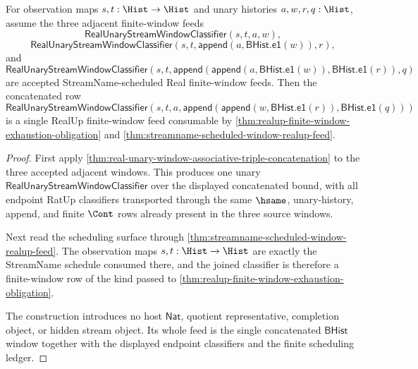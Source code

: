 \begin{theorem}
\label{thm:realup-window-concatenation-streamname-feed}
For observation maps $s,t:\Hist\to\Hist$ and unary histories
$a,w,r,q:\Hist$, assume the three adjacent finite-window feeds
$$
\mathsf{RealUnaryStreamWindowClassifier}(s,t,a,w),
$$
$$
\mathsf{RealUnaryStreamWindowClassifier}
(s,t,\mathsf{append}(a,\mathsf{BHist.e1}(w)),r),
$$
and
$$
\mathsf{RealUnaryStreamWindowClassifier}
(s,t,\mathsf{append}(\mathsf{append}(a,\mathsf{BHist.e1}(w)),
\mathsf{BHist.e1}(r)),q)
$$
are accepted StreamName-scheduled Real finite-window feeds. Then the
concatenated row
$$
\mathsf{RealUnaryStreamWindowClassifier}
(s,t,a,\mathsf{append}(\mathsf{append}(w,\mathsf{BHist.e1}(r)),
\mathsf{BHist.e1}(q)))
$$
is a single RealUp finite-window feed consumable by
\autoref{thm:realup-finite-window-exhaustion-obligation} and
\autoref{thm:streamname-scheduled-window-realup-feed}.
\end{theorem}
\begin{proof}
First apply
\autoref{thm:real-unary-window-associative-triple-concatenation} to the three
accepted adjacent windows. This produces one unary
$\mathsf{RealUnaryStreamWindowClassifier}$ over the displayed concatenated
bound, with all endpoint RatUp classifiers transported through the same
$\hsame$, unary-history, append, and finite $\Cont$ rows already present in the
three source windows.

Next read the scheduling surface through
\autoref{thm:streamname-scheduled-window-realup-feed}. The observation maps
$s,t:\Hist\to\Hist$ are exactly the StreamName schedule consumed there, and the
joined classifier is therefore a finite-window row of the kind passed to
\autoref{thm:realup-finite-window-exhaustion-obligation}.

The construction introduces no host $\mathsf{Nat}$, quotient representative,
completion object, or hidden stream object. Its whole feed is the single
concatenated $\mathsf{BHist}$ window together with the displayed endpoint
classifiers and the finite scheduling ledger.
\end{proof}

